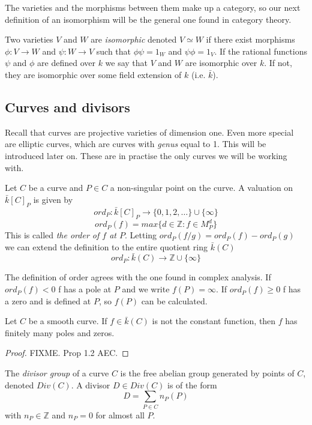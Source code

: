 The varieties and the morphisms between them make up a category, so our next
definition of an isomorphism will be the general one found in category theory.

\begin{mydef}
 Two varieties $V$ and $W$ are \emph{isomorphic} denoted $V\simeq W$
if there exist morphisms $\phi: V \rightarrow W$ and $\psi: W \rightarrow V$ such that
$\phi \psi = 1_W$ and $\psi \phi = 1_V$.
If the rational functions $\psi$ and $\phi$ are defined over $k$ we say that $V$ and $W$
are isomorphic over $k$. If not, they are isomorphic over some field extension of $k$
(i.e. $\bar{k}$).
\end{mydef}


\subsection{Curves and divisors}
Recall that curves are projective varieties of dimension one. Even more special
are elliptic curves, which are curves with \emph{genus} equal to 1. This will
be introduced later on. These are in practise the only curves we will be working with.

\begin{mydef}
 Let $C$ be a curve and $P\in C$ a non-singular point on the curve. A valuation on
$\bar{k}[C]_P$ is given by
$$ ord_P : \bar{k}[C]_P \rightarrow \{ 0, 1, 2, \ldots \} \cup \{ \infty \} $$
$$ ord_P(f) = max \{ d\in \mathbb{Z} : f\in M_P^d \} $$
This is called \emph{the order of $f$ at $P$}.
Letting $ord_P(f/g) = ord_P(f) - ord_P(g)$ we can extend the definition to the entire
quotient ring $\bar{k}(C)$
$$ ord_P: \bar{k}(C) \rightarrow \mathbb{Z}\cup \{\infty \} $$
\end{mydef}

The definition of order agrees with the one found in complex analysis.
If $ord_P(f) < 0$ f has a pole at $P$ and we write $f(P)=\infty$. 
If $ord_P(f) \ge 0$ f has a zero and is defined at $P$, so $f(P)$ can be calculated. 

\begin{prop}
 Let $C$ be a smooth curve. If $f\in \bar{k}(C)$ is not the constant function, then
$f$ has finitely many poles and zeros.
\label{prop:1}
\end{prop}
\begin{proof}
 FIXME. Prop 1.2 AEC.
\end{proof}

\begin{mydef}
 The \emph{divisor group} of a curve $C$ is the free abelian group generated by
points of $C$, denoted $Div(C)$. A divisor $D\in Div(C)$ is of the form
$$ D = \sum_{P\in C} n_P(P)$$
with $n_P\in\mathbb{Z}$ and $n_P = 0$ for almost all $P$.
\end{mydef}

